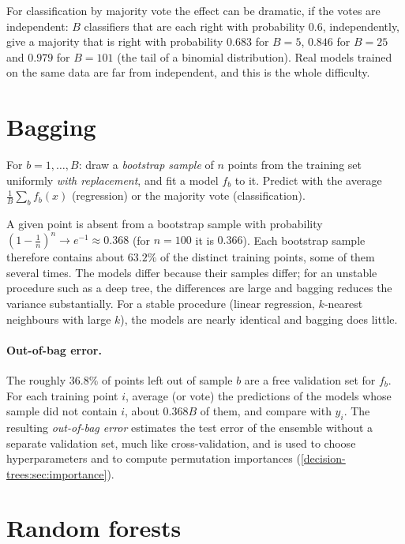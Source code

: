 \begin{notechapter}
For classification by majority vote the effect can be dramatic, if the votes are
independent: $B$ classifiers that are each right with probability $0.6$, independently, give
a majority that is right with probability $0.683$ for $B = 5$, $0.846$ for $B = 25$ and $0.979$ for
$B = 101$ (the tail of a binomial distribution). Real models trained on the same data are
far from independent, and this is the whole difficulty.

\section{Bagging}\label{ensemble-methods:sec:bagging}

\begin{definition}
For $b = 1,\dots,B$: draw a \emph{bootstrap sample} of $n$ points from the training set uniformly
\emph{with replacement}, and fit a model $f_b$ to it. Predict with the average $\frac1B\sum_bf_b(x)$
(regression) or the majority vote (classification).
\end{definition}

A given point is absent from a bootstrap sample with probability $(1 - \frac1n)^n\to e^{-1}\approx0.368$ (for
$n = 100$ it is $0.366$). Each bootstrap sample therefore contains about $63.2\%$ of the distinct
training points, some of them several times. The models differ because their samples
differ; for an unstable procedure such as a deep tree, the differences are large and
bagging reduces the variance substantially. For a stable procedure (linear regression,
$k$-nearest neighbours with large $k$), the models are nearly identical and bagging does
little.

\paragraph{Out-of-bag error.} The roughly $36.8\%$ of points left out of sample $b$ are a free
validation set for $f_b$. For each training point $i$, average (or vote) the predictions of
the models whose sample did not contain $i$, about $0.368B$ of them, and compare with $y_i$. The
resulting \emph{out-of-bag error} estimates the test error of the ensemble without a
separate validation set, much like cross-validation, and is used to choose
hyperparameters and to compute permutation importances
(\cref{decision-trees:sec:importance}).

\section{Random forests}\label{ensemble-methods:sec:rf}


\end{notechapter}
